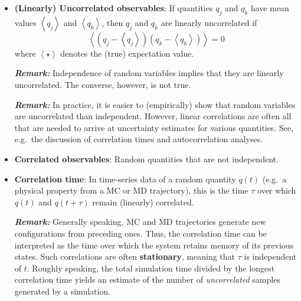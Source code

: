 \begin{itemize}
\item {\bf (Linearly) Uncorrelated observables}:  If quantities $q_j$ and $q_k$ have mean values $\left< q_j \right> $ and $\left< q_k \right>$, then $q_j$ and $q_k$ are linearly uncorrelated if
% 
\begin{equation}
  \left< \left(q_j - \left<q_j\right> \right) \left(q_k - \left<q_k\right> \right) \right>=0
\end{equation}
%
where $\left< \star \right>$ denotes the (true) expectation value.

\smallskip

\textbf{\textit{Remark:}} Independence of random variables implies that they are linearly uncorrelated.  The converse, however, is not true.  

\smallskip

\textbf{\textit{Remark:}} In practice, it is easier to (empirically) show that random variables are uncorrelated than independent.  However, linear correlations are often all that are needed to arrive at uncertainty estimates for various quantities.  See, e.g.\ the discussion of correlation times and autocorrelation analyses.



\item {\bf Correlated observables}: Random quantities that are not independent.

\item {\bf Correlation time}: In time-series data of a random quantity $q(t)$ (e.g.\ a physical property from a MC or MD trajectory), this is the time $\tau$ over which $q(t)$ and $q(t+\tau)$ remain (linearly) correlated.

\smallskip

\textbf{\textit{Remark:}} Generally speaking, MC and MD trajectories generate new configurations from preceding ones.
Thus, the correlation time can be interpreted as the time over which the system retains memory of its previous states.
Such correlations are often {\bf stationary}, meaning that $\tau$ is independent of $t$.
Roughly speaking, the total simulation time divided by the longest correlation time yields an estimate of the number of {\it uncorrelated} samples generated by a simulation.




\end{itemize}
